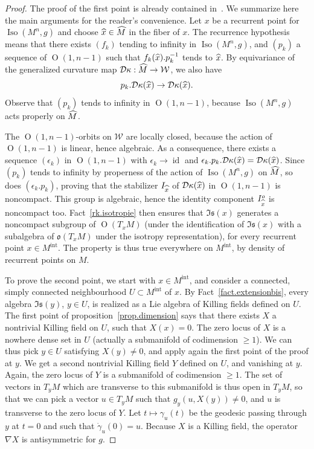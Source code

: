 \documentclass[11pt]{article}
\theoremstyle{definition}
\numberwithin{equation}{section}
\numberwithin{figure}{section}
\numberwithin{table}{section}
\DeclareMathOperator{\Iso}{Iso}
\DeclareMathOperator{\id}{id}
\newcommand{\mint}{{M^{\intl}}}
\DeclareMathOperator{\intl}{int}
\newcommand*\dk{{\mathcal{D}\kappa}}
\newcommand{\hm}{{\hat{M}}}
\newcommand{\hx}{{\hat{x}}}
\let\oldhat\hat
\renewcommand*\hat[1]{\mathchoice{\widehat{#1}}{\widehat{#1}}{\widehat{#1}}{\oldhat{#1}}}
\begin{document}
\begin{proof}
The proof of the first point is already contained in~\cite[Proposition~5.1]{frances.open}. We summarize here the main arguments for the reader's convenience. Let $x$ be a recurrent point for $\Iso(M^n,g)$ and choose $\hx \in \hm$ in the fiber of $x$. The recurrence hypothesis means that there exists $(f_k)$ tending to infinity in $\Iso(M^n,g)$, and $(p_k)$ a sequence of ${\operatorname O}(1,n-1)$ such that $f_k(\hx).p_k^{-1}$ tends to $\hx$. By equivariance of the generalized curvature map $\dk: \hm \to \mathcal{W}$, we also have
\[
p_k.\dk(\hx) \to \dk(\hx).
\]
Observe that $(p_k)$ tends to infinity in ${\operatorname O}(1,n-1)$, because $\Iso(M^n,g)$ acts properly on $\hm$.

The ${\operatorname O}(1,n-1)$-orbits on $\mathcal{W}$ are locally closed, because the action of ${\operatorname O}(1,n-1)$ is linear, hence algebraic. As a consequence, there exists a sequence $(\epsilon_k)$ in ${\operatorname O}(1,n-1)$ with $\epsilon_k \to \id$ and $\epsilon_k.p_k.\dk(\hx) = \dk(\hx)$. Since $(p_k)$ tends to infinity by properness of the action of $\Iso(M^n,g)$ on $\hm$, so does $(\epsilon_k.p_k)$, proving that the stabilizer $I_{\hx}$ of $\dk(\hx)$ in ${\operatorname O}(1,n-1)$ is noncompact. This group is algebraic, hence the identity component $I_{\hx}^{o}$ is noncompact too. Fact~\ref{rk.isotropie} then ensures that $\mathfrak{Is}(x)$ generates a noncompact subgroup of ${\operatorname O}(T_xM)$ (under the identification of $\mathfrak{Is}(x)$ with a subalgebra of $\mathfrak{o}(T_xM)$ under the isotropy representation), for every recurrent point $x \in \mint$. The property is thus true everywhere on $\mint$, by density of recurrent points on $M$.

To prove the second point, we start with $x \in \mint$, and consider a connected, simply connected neighbourhood $U \subset \mint$ of $x$. By Fact~\ref{fact.extensionbis}, every algebra $\mathfrak{Is}(y)$, $y \in U$, is realized as a Lie algebra of Killing fields defined on $U$. The first point of proposition~\ref{prop.dimension} says that there exists $X$ a nontrivial Killing field on $U$, such that $X(x)=0$. The zero locus of $X$ is a nowhere dense set in $U$ (actually a submanifold of codimension $\geq 1$). We can thus pick $y \in U$ satisfying $X(y) \not =0$, and apply again the first point of the proof at $y$. We get a second nontrivial Killing field $Y$ defined on $U$, and vanishing at $y$. Again, the zero locus of $Y$ is a submanifold of codimension $\geq 1$. The set of vectors in $T_yM$ which are transverse to this submanifold is thus open in $T_yM$, so that we can pick a vector $u \in T_yM$ such that $g_y(u,X(y)) \not =0$, and $u$ is transverse to the zero locus of $Y$. Let $t \mapsto \gamma_u(t)$ be the geodesic passing through $y$ at $t =0$ and such that $\dot{\gamma}_u(0)=u$. Because $X$ is a Killing field, the operator $\nabla X$ is antisymmetric for $g$.


\end{proof}
\end{document}
